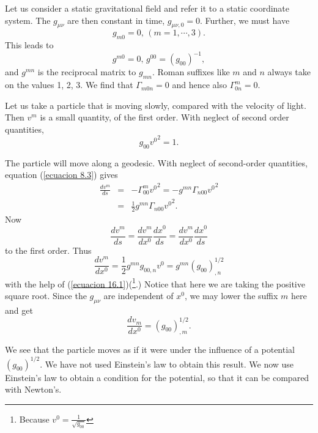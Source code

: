Let us consider a static gravitational field and refer it to a static coordinate system. The $g_{\mu\nu}$ are then 
constant in time, $g_{\mu\nu,0} = 0$. Further, we must have 
\[
 g_{m0} = 0, \, \left( m=1,\cdots,3 \right) .
\]
This leads to
\[
 g^{m0} = 0, \, g^{00} = (g_{00})^{-1},
\]
and $g^{mn}$ is the reciprocal matrix to $g_{mn}$. Roman suffixes like $m$ and $n$ always take on the values 1, 2, 3. 
We find that $\Gamma_{m0n} = 0$ and hence also $\Gamma^{m}_{0n}=0$.

Let us take a particle that is moving slowly, compared with the velocity of light. Then $v^m$ is a small quantity, of 
the first order. With neglect of second order quantities,
\begin{equation}
 \label{ecuacion 16.1}
 g_{00} {v^{0}}^2 = 1.
\end{equation}

The particle will move along a geodesic. With neglect of second-order quantities, equation (\ref{ecuacion 8.3}) gives
\[
 \begin{array}{rcl}
  \frac{dv^m}{ds} & = & -\Gamma^m_{00} {v^0}^2 = - g^{mn}\Gamma_{n00} {v^0}^2 \\
  & = & \frac{1}{2} g^{mn} \Gamma_{n00} {v^0}^2 .
 \end{array}
\]
Now
\[
 \frac{dv^m}{d s} = \frac{d v^m}{dx^0} \frac{d x^0}{ds} = \frac{d v^m}{dx^0} \frac{d x^0}{ds}
\]
to the first order. Thus
\begin{equation}
 \label{ecuacion 16.2}
 \frac{dv^m}{dx^0} = \frac{1}{2} g^{mn} g_{00,n} v^0 = g^{mn}\left( g_{00}\right)^{1/2}_{,n}
\end{equation}
with the help of (\ref{ecuacion 16.1})(\footnote{Because ${v^0} = 
\frac{1}{\sqrt{g_00}}$}.) Notice that here we are taking the positive square root. Since the $g_{\mu\nu}$ are 
independent of $x^0$, we may lower the suffix $m$ here and get
\begin{equation}
 \label{ecuacion 16.3}
 \frac{dv_m}{dx^0} = \left( g_{00} \right)^{1/2}_{,m}.
\end{equation}

We see that the particle moves as if it were under the influence of a potential $\left( g_{00} \right)^{1/2}$. We have 
not used Einstein's law to obtain this result. We now use Einstein's law to obtain a condition for the potential, so 
that it can be compared with Newton's.









